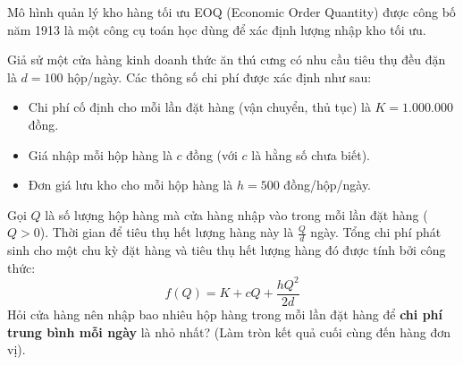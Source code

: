 \documentclass[12pt]{article}
\begin{document}
	\begin{vidu}[2]
		Mô hình quản lý kho hàng tối ưu EOQ (Economic Order Quantity) được công bố năm 1913 là một công cụ toán học dùng để xác định lượng nhập kho tối ưu. 
		
		Giả sử một cửa hàng kinh doanh thức ăn thú cưng có nhu cầu tiêu thụ đều đặn là $d = 100$ hộp/ngày. Các thông số chi phí được xác định như sau: 
		\begin{itemize}
			\item Chi phí cố định cho mỗi lần đặt hàng (vận chuyển, thủ tục) là $K = 1.000.000$ đồng.
			\item Giá nhập mỗi hộp hàng là $c$ đồng (với $c$ là hằng số chưa biết).
			\item Đơn giá lưu kho cho mỗi hộp hàng là $h = 500$ đồng/hộp/ngày.
		\end{itemize}
		Gọi $Q$ là số lượng hộp hàng mà cửa hàng nhập vào trong mỗi lần đặt hàng ($Q > 0$). Thời gian để tiêu thụ hết lượng hàng này là $\frac{Q}{d}$ ngày. Tổng chi phí phát sinh cho một chu kỳ đặt hàng và tiêu thụ hết lượng hàng đó được tính bởi công thức:
		\[ f(Q) = K + cQ + \frac{hQ^2}{2d} \]
		Hỏi cửa hàng nên nhập bao nhiêu hộp hàng trong mỗi lần đặt hàng để \textbf{chi phí trung bình mỗi ngày} là nhỏ nhất? (Làm tròn kết quả cuối cùng đến hàng đơn vị).
	\end{vidu}
	
\end{document}
